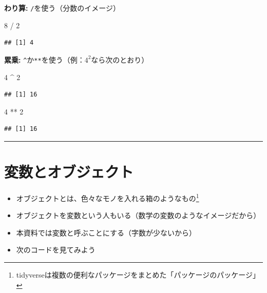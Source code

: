 \documentclass[
]{book}
\newenvironment{Shaded}{\begin{snugshade}}{\end{snugshade}}
\newcommand{\DecValTok}[1]{\textcolor[rgb]{0.00,0.00,0.81}{#1}}
\newcommand{\SpecialCharTok}[1]{\textcolor[rgb]{0.00,0.00,0.00}{#1}}
\begin{document}
\textbf{わり算:} \texttt{/}を使う（分数のイメージ）

\begin{Shaded}
\begin{Highlighting}[]
\DecValTok{8} \SpecialCharTok{/} \DecValTok{2}
\end{Highlighting}
\end{Shaded}

\begin{verbatim}
## [1] 4
\end{verbatim}

\textbf{累乗:} \texttt{\^{}}か\texttt{**}を使う（例：\(4^2\)なら次のとおり）

\begin{Shaded}
\begin{Highlighting}[]
\DecValTok{4} \SpecialCharTok{\^{}} \DecValTok{2}
\end{Highlighting}
\end{Shaded}

\begin{verbatim}
## [1] 16
\end{verbatim}

\begin{Shaded}
\begin{Highlighting}[]
\DecValTok{4} \SpecialCharTok{**} \DecValTok{2}
\end{Highlighting}
\end{Shaded}

\begin{verbatim}
## [1] 16
\end{verbatim}

\begin{center}\rule{0.5\linewidth}{0.5pt}\end{center}

\hypertarget{ux5909ux6570ux3068ux30aaux30d6ux30b8ux30a7ux30afux30c8}{%
\section{変数とオブジェクト}\label{ux5909ux6570ux3068ux30aaux30d6ux30b8ux30a7ux30afux30c8}}

\begin{itemize}
\item
  オブジェクトとは、色々なモノを入れる箱のようなもの\footnote{tidyverseは複数の便利なパッケージをまとめた「パッケージのパッケージ」}\\
\item
  オブジェクトを変数という人もいる（数学の変数のようなイメージだから）
\item
  本資料では変数と呼ぶことにする（字数が少ないから）
\item
  次のコードを見てみよう
\end{itemize}
\end{document}
